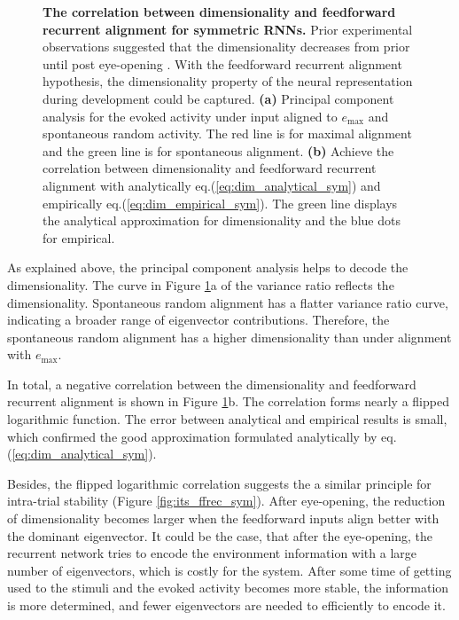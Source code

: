 \documentclass[11pt]{article}
\begin{document}
\begin{figure}[H]
			\caption{\textbf{The correlation between dimensionality and feedforward recurrent alignment for symmetric RNNs.} Prior experimental observations suggested that the dimensionality decreases from prior until post eye-opening \cite{tragenap2023nature}. With the feedforward recurrent alignment hypothesis, the dimensionality property of the neural representation during development could be captured. \textbf{(a)} Principal component analysis for the evoked activity under input aligned to $e_{\text{max}}$ and spontaneous random activity. The red line is for maximal alignment and the green line is for spontaneous alignment. \textbf{(b)} Achieve the correlation between dimensionality and feedforward recurrent alignment with analytically eq.(\ref{eq:dim_analytical_sym}) and empirically eq.(\ref{eq:dim_empirical_sym}). The green line displays the analytical approximation for dimensionality and the blue dots for empirical.} 
			\label{fig:correlation_dim_ffrec_sym}
		\end{figure}
	\vspace{-0.2cm}
	As explained above, the principal component analysis helps to decode the dimensionality. The curve in Figure \ref{fig:correlation_dim_ffrec_sym}a of the variance ratio reflects the dimensionality. Spontaneous random alignment has a flatter variance ratio curve, indicating a broader range of eigenvector contributions. Therefore, the spontaneous random alignment has a higher dimensionality than under alignment with $e_{\text{max}}$. 
	
	In total, a negative correlation between the dimensionality and feedforward recurrent alignment is shown in Figure \ref{fig:correlation_dim_ffrec_sym}b. The correlation forms nearly a flipped logarithmic function. The error between analytical and empirical results is small, which confirmed the good approximation formulated analytically by eq.(\ref{eq:dim_analytical_sym}). 
	
	Besides, the flipped logarithmic correlation suggests the a similar principle for intra-trial stability (Figure \ref{fig:its_ffrec_sym}). After eye-opening, the reduction of dimensionality becomes larger when the feedforward inputs align better with the dominant eigenvector. It could be the case, that after the eye-opening, the recurrent network tries to encode the environment information with a large number of eigenvectors, which is costly for the system. After some time of getting used to the stimuli and the evoked activity becomes more stable, the information is more determined, and fewer eigenvectors are needed to efficiently to encode it.
	
\end{document}
